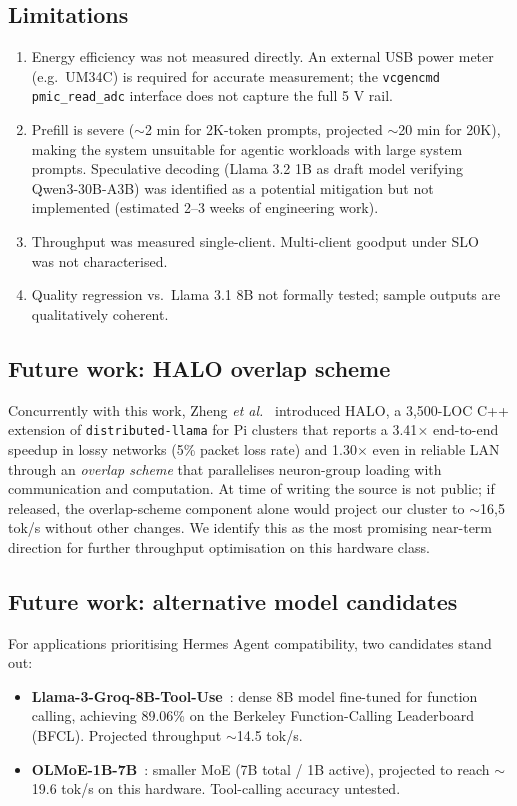 \documentclass[11pt,a4paper]{article}
\begin{document}
\subsection{Limitations}
\begin{enumerate}[leftmargin=*,nosep]
  \item Energy efficiency was not measured directly. An external USB power meter (e.g.\ UM34C) is required for accurate measurement; the \texttt{vcgencmd pmic\_read\_adc} interface does not capture the full 5 V rail.
  \item Prefill is severe ($\sim$2 min for 2K-token prompts, projected $\sim$20 min for 20K), making the system unsuitable for agentic workloads with large system prompts. Speculative decoding (Llama 3.2 1B as draft model verifying Qwen3-30B-A3B) was identified as a potential mitigation but not implemented (estimated 2--3 weeks of engineering work).
  \item Throughput was measured single-client. Multi-client goodput under SLO~\cite{zhong2024distserve} was not characterised.
  \item Quality regression vs.\ Llama 3.1 8B not formally tested; sample outputs are qualitatively coherent.
\end{enumerate}

\subsection{Future work: HALO overlap scheme}
Concurrently with this work, Zheng \emph{et al.}~\cite{halo2026} introduced HALO, a 3{,}500-LOC C++ extension of \texttt{distributed-llama} for Pi clusters that reports a 3.41$\times$ end-to-end speedup in lossy networks (5\% packet loss rate) and 1.30$\times$ even in reliable LAN through an \emph{overlap scheme} that parallelises neuron-group loading with communication and computation. At time of writing the source is not public; if released, the overlap-scheme component alone would project our cluster to $\sim$16{,}5 tok/s without other changes. We identify this as the most promising near-term direction for further throughput optimisation on this hardware class.

\subsection{Future work: alternative model candidates}
\label{sec:future-models}
For applications prioritising Hermes Agent compatibility, two candidates stand out:
\begin{itemize}[leftmargin=*,nosep]
  \item \textbf{Llama-3-Groq-8B-Tool-Use}~\cite{groq2024tooluse}: dense 8B model fine-tuned for function calling, achieving 89.06\% on the Berkeley Function-Calling Leaderboard (BFCL). Projected throughput $\sim$14.5 tok/s.
  \item \textbf{OLMoE-1B-7B}~\cite{muennighoff2024olmoe}: smaller MoE (7B total / 1B active), projected to reach $\sim$19.6 tok/s on this hardware. Tool-calling accuracy untested.
\end{itemize}
\end{document}
